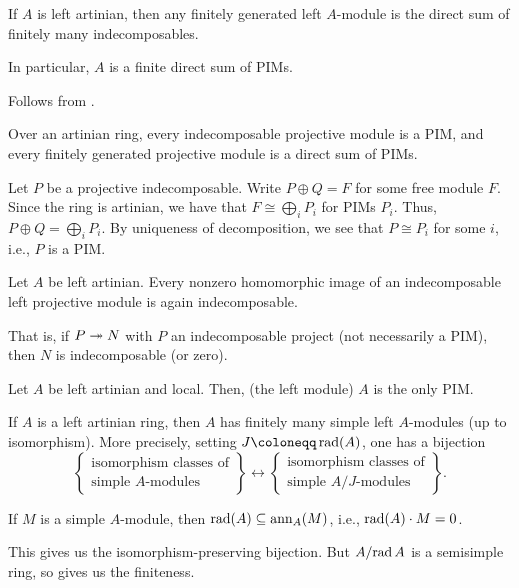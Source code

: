 \documentclass[12pt]{article}
\begin{document}
\begin{thm}
	If $A$ is left artinian, then any finitely generated left $A$-module is the direct sum of finitely many indecomposables. 

	In particular, $A$ is a finite direct sum of PIMs.
\end{thm}
\begin{sketch}
	Follows from .
\end{sketch}
\begin{thm}
	Over an artinian ring, every indecomposable projective module is a PIM, 
	and every finitely generated projective module is a direct sum of PIMs.
\end{thm}
\begin{sketch}
	Let $P$ be a projective indecomposable. 
	Write $P \oplus Q = F$ for some free module $F$.
	Since the ring is artinian, we have that $F \cong \bigoplus_{i} P_{i}$ for PIMs $P_{i}$. 
	Thus, $P \oplus Q = \bigoplus_{i} P_{i}$. 
	By uniqueness of decomposition, we see that $P \cong P_{i}$ for some $i$, i.e., 
	$P$ is a PIM.
\end{sketch}

\begin{thm}
	Let $A$ be left artinian. 
	Every nonzero homomorphic image of an indecomposable left projective module is again indecomposable.

	That is, if $P \twoheadrightarrow N$ with $P$ an indecomposable project (not necessarily a PIM), then $N$ is indecomposable (or zero).
\end{thm}

\begin{thm}
	Let $A$ be left artinian and local.
	Then, (the left module) $A$ is the only PIM.
\end{thm}

\begin{thm}
	If $A$ is a left artinian ring, then $A$ has finitely many simple left $A$-modules (up to isomorphism). 
	More precisely, setting $J \coloneqq \rad(A)$, one has a bijection
	\begin{equation*} 
		\left\{
			\begin{array}{c}
				\text{isomorphism classes of}\\
				\text{simple $A$-modules}
			\end{array}
		\right\}
		\leftrightarrow 
		\left\{
			\begin{array}{c}
				\text{isomorphism classes of}\\
				\text{simple $A/J$-modules}
			\end{array}
		\right\}.
	\end{equation*}
\end{thm}
\begin{sketch}
	If $M$ is a simple $A$-module, then $\operatorname{rad}(A) \subseteq \operatorname{ann}_{A}(M)$, i.e., $\operatorname{rad}(A) \cdot M = 0$. 

	This gives us the isomorphism-preserving bijection. 
	But $A/{\operatorname{rad} A}$ is a semisimple ring, so 
	 gives us the finiteness.
\end{sketch}
\end{document}
